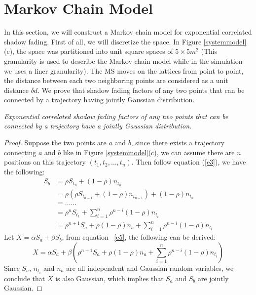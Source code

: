 \section{Markov Chain Model}
\label{sec:markov}
In this section, we will construct a Markov chain model for exponential correlated shadow fading. First of all, we will discretize the space. In Figure \ref{systemmodel}(c), the space was partitioned into unit square spaces of $5\times5m^{2}$ (This granularity is used to describe the Markov chain model while in the simulation we uses a finer granularity). The MS moves on the lattices from point to point, the distance between each two neighboring points are considered as a unit distance $\delta d$. We prove that shadow fading factors of any two points that can be connected by a trajectory having jointly Gaussian distribution.
\begin{lem}
\emph{Exponential correlated shadow fading factors of any two points that can be connected by a trajectory have a jointly Gaussian distribution.}
\end{lem}
\begin{proof}Suppose the two points are $a$ and $b$, since there exists a trajectory connecting $a$ and $b$ like in Figure \ref{systemmodel}(c), we can assume there are $n$ positions on this trajectory $(t_{1},t_{2},\dots,t_{n})$. Then follow equation (\ref{e3}), we have the following:
\begin{equation}
\label{e5}
\begin{split}
S_{b} &=\rho S_{t_{n}}+(1-\rho)n_{t_{n}}\\
&=\rho(\rho S_{t_{n-1}}+(1-\rho)n_{t_{n-1}})+(1-\rho)n_{t_{n}}\\
&=\ldots\ldots\\
&=\rho^{n}S_{t_{1}}+\sum_{i=1}^{n}\rho^{n-i}(1-\rho)n_{t_{i}}\\
&=\rho^{n+1}S_{a}+\rho(1-\rho)n_{a}+\sum_{i=1}^{n}\rho^{n-i}(1-\rho)n_{t_{i}}
\end{split}
\end{equation}
Let $X=\alpha S_{a}+\beta S_{b}$, from equation ~\ref{e5}, the following can be derived:
\begin{equation}
X=\alpha S_{a}+\beta(\rho^{n+1}S_{a}+\rho(1-\rho)n_{a}+\sum_{i=1}^{n}\rho^{n-i}(1-\rho)n_{t_{i}})
\end{equation}
Since $S_{a}$, $n_{t_{i}}$ and $n_{a}$ are all independent and Gaussian random variables, we conclude that $X$ is also Gaussian, which implies that $S_{a}$ and $S_{b}$ are jointly Gaussian.
\end{proof}

